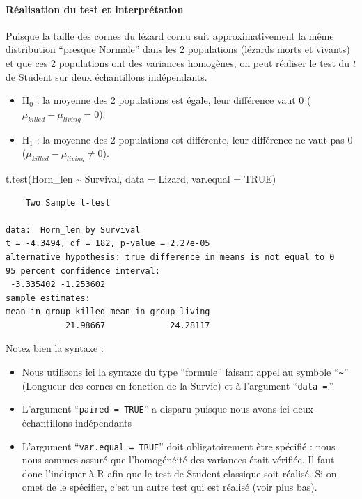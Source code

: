 \documentclass[
  a4paper,
]{article}
\newenvironment{Shaded}{\begin{snugshade}}{\end{snugshade}}
\newcommand{\AttributeTok}[1]{\textcolor[rgb]{0.00,0.34,0.68}{#1}}
\newcommand{\ConstantTok}[1]{\textcolor[rgb]{0.67,0.33,0.00}{#1}}
\newcommand{\FunctionTok}[1]{\textcolor[rgb]{0.39,0.29,0.61}{#1}}
\newcommand{\NormalTok}[1]{\textcolor[rgb]{0.12,0.11,0.11}{#1}}
\newcommand{\SpecialCharTok}[1]{\textcolor[rgb]{0.24,0.68,0.91}{#1}}
\providecommand{\tightlist}{%
  \setlength{\itemsep}{0pt}\setlength{\parskip}{0pt}}
\begin{document}
\hypertarget{ruxe9alisation-du-test-et-interpruxe9tation-2}{%
\paragraph{Réalisation du test et interprétation}\label{ruxe9alisation-du-test-et-interpruxe9tation-2}}

Puisque la taille des cornes du lézard cornu suit approximativement la même distribution ``presque Normale'' dans les 2 populations (lézards morts et vivants) et que ces 2 populations ont des variances homogènes, on peut réaliser le test du \(t\) de Student sur deux échantillons indépendants.

\begin{itemize}
\tightlist
\item
  H\(_0\) : la moyenne des 2 populations est égale, leur différence vaut 0 (\(\mu_{killed}-\mu_{living} = 0\)).
\item
  H\(_1\) : la moyenne des 2 populations est différente, leur différence ne vaut pas 0 (\(\mu_{killed}-\mu_{living} \neq 0\)).
\end{itemize}

\begin{Shaded}
\begin{Highlighting}[]
\FunctionTok{t.test}\NormalTok{(Horn\_len }\SpecialCharTok{\textasciitilde{}}\NormalTok{ Survival, }\AttributeTok{data =}\NormalTok{ Lizard, }\AttributeTok{var.equal =} \ConstantTok{TRUE}\NormalTok{)}
\end{Highlighting}
\end{Shaded}

\begin{verbatim}
    Two Sample t-test

data:  Horn_len by Survival
t = -4.3494, df = 182, p-value = 2.27e-05
alternative hypothesis: true difference in means is not equal to 0
95 percent confidence interval:
 -3.335402 -1.253602
sample estimates:
mean in group killed mean in group living 
            21.98667             24.28117 
\end{verbatim}

Notez bien la syntaxe :

\begin{itemize}
\tightlist
\item
  Nous utilisons ici la syntaxe du type ``formule'' faisant appel au symbole ``\texttt{\textasciitilde{}}'' (Longueur des cornes en fonction de la Survie) et à l'argument ``\texttt{data\ =}.''
\item
  L'argument ``\texttt{paired\ =\ TRUE}'' a disparu puisque nous avons ici deux échantillons indépendants
\item
  L'argument ``\texttt{var.equal\ =\ TRUE}'' doit obligatoirement être spécifié : nous nous sommes assuré que l'homogénéité des variances était vérifiée. Il faut donc l'indiquer à R afin que le test de Student classique soit réalisé. Si on omet de le spécifier, c'est un autre test qui est réalisé (voir plus bas).
\end{itemize}
\end{document}

